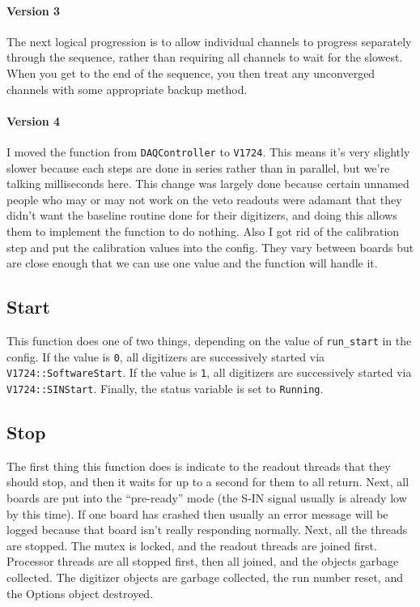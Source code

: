 \paragraph{Version 3}

The next logical progression is to allow individual channels to progress separately through the sequence, rather than requiring all channels to wait for the slowest.
When you get to the end of the sequence, you then treat any unconverged channels with some appropriate backup method.

\paragraph{Version 4}

I moved the function from \texttt{DAQController} to \texttt{V1724}.
This means it's very slightly slower because each steps are done in series rather than in parallel, but we're talking milliseconds here.
This change was largely done because certain unnamed people who may or may not work on the veto readouts were adamant that they didn't want the baseline routine done for their digitizers, and doing this allows them to implement the function to do nothing.
Also I got rid of the calibration step and put the calibration values into the config.
They vary between boards but are close enough that we can use one value and the function will handle it.

\subsection{Start}

This function does one of two things, depending on the value of \texttt{run\_start} in the config.
If the value is \texttt{0}, all digitizers are successively started via \texttt{V1724::SoftwareStart}.
If the value is \texttt{1}, all digitizers are successively started via \texttt{V1724::SINStart}.
Finally, the status variable is set to \texttt{Running}.

\subsection{Stop}

The first thing this function does is indicate to the readout threads that they should stop, and then it waits for up to a second for them to all return.
Next, all boards are put into the ``pre-ready'' mode (the S-IN signal usually is already low by this time).
If one board has crashed then usually an error message will be logged because that board isn't really responding normally.
Next, all the threads are stopped.
The mutex is locked, and the readout threads are joined first.
Processor threads are all stopped first, then all joined, and the objects garbage collected.
The digitizer objects are garbage collected, the run number reset, and the Options object destroyed.

